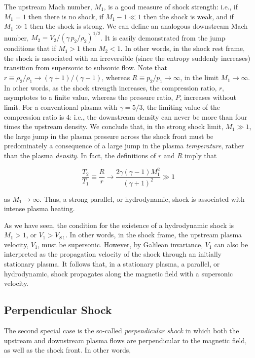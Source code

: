 \documentclass[
  notoc %
]{tufte-book}
\begin{document}
The upstream Mach number, \(M_1\), is a good measure of shock strength:
i.e., if \(M_1=1\) then there is no shock, if \(M_1-1 \ll 1\) then the
shock is weak, and if \(M_1\gg 1\) then the shock is strong. We can
define an analogous downstream Mach number,
\(M_2=V_2/(\gamma\,p_2/\rho_2)^{1/2}\). It is easily demonstrated from
the jump conditions that if \(M_1>1\) then \(M_2 < 1\). In other words,
in the shock rest frame, the shock is associated with an irreversible
(since the entropy suddenly increases) transition from supersonic to
subsonic flow. Note that
\(r\equiv \rho_2/\rho_1\rightarrow (\gamma+1)/(\gamma-1)\), whereas
\(R\equiv p_2/p_1\rightarrow\infty\), in the limit
\(M_1\rightarrow \infty\). In other words, as the shock strength
increases, the compression ratio, \(r\), asymptotes to a finite value,
whereas the pressure ratio, \(P\), increases without limit. For a
conventional plasma with \(\gamma=5/3\), the limiting value of the
compression ratio is 4: i.e., the downstream density can never be more
than four times the upstream density. We conclude that, in the strong
shock limit, \(M_1\gg 1\), the large jump in the plasma pressure across
the shock front must be predominately a consequence of a large jump in
the plasma \emph{temperature}, rather than the plasma \emph{density}. In
fact, the definitions of \(r\) and \(R\) imply that

\[
\frac{T_2}{T_1}\equiv \frac{R}{r}\rightarrow \frac{2\gamma(\gamma-1)M_1^2}{(\gamma+1)^2}\gg 1
\]

as \(M_1\rightarrow\infty\). Thus, a strong parallel, or hydrodynamic,
shock is associated with intense plasma heating.

As we have seen, the condition for the existence of a hydrodynamic shock
is \(M_1>1\), or \(V_1 > V_{S\,1}\). In other words, in the shock frame,
the upstream plasma velocity, \(V_1\), must be supersonic. However, by
Galilean invariance, \(V_1\) can also be interpreted as the propagation
velocity of the shock through an initially stationary plasma. It follows
that, in a stationary plasma, a parallel, or hydrodynamic, shock
propagates along the magnetic field with a supersonic velocity.

\hypertarget{sec:perp_shock}{%
\subsection{Perpendicular Shock}\label{sec:perp_shock}}

The second special case is the so-called \emph{perpendicular shock} in
which both the upstream and downstream plasma flows are perpendicular to
the magnetic field, as well as the shock front. In other words,
\end{document}

